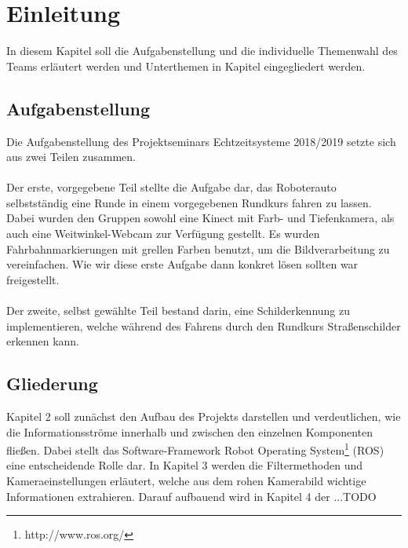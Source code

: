 \section{Einleitung}
In diesem Kapitel soll die Aufgabenstellung und die individuelle Themenwahl des Teams erl\"autert werden und Unterthemen in Kapitel eingegliedert werden.


\subsection{Aufgabenstellung}
Die Aufgabenstellung des Projektseminars Echtzeitsysteme 2018/2019 setzte sich aus zwei Teilen zusammen. \\\\
Der erste, vorgegebene Teil stellte die Aufgabe dar, das Roboterauto selbstst\"andig eine Runde in einem vorgegebenen Rundkurs fahren zu lassen. Dabei wurden den Gruppen sowohl eine Kinect mit Farb- und Tiefenkamera, als auch eine Weitwinkel-Webcam zur Verf\"ugung gestellt. Es wurden Fahrbahnmarkierungen mit grellen Farben benutzt, um die Bildverarbeitung zu vereinfachen. Wie wir diese erste Aufgabe dann konkret l\"osen sollten war freigestellt. \\\\
Der zweite, selbst gew\"ahlte Teil bestand darin, eine Schilderkennung zu implementieren, welche w\"ahrend des Fahrens durch den Rundkurs Stra\ss{}enschilder erkennen kann.

\subsection{Gliederung}
Kapitel 2 soll zun\"achst den Aufbau des Projekts darstellen und verdeutlichen, wie die Informationsstr\"ome innerhalb und zwischen den einzelnen Komponenten flie\ss{}en. Dabei stellt das Software-Framework Robot Operating System\footnote{http://www.ros.org/} (ROS) eine entscheidende Rolle dar. In Kapitel 3 werden die Filtermethoden und Kameraeinstellungen erl\"autert, welche aus dem rohen Kamerabild wichtige Informationen extrahieren. Darauf aufbauend wird in Kapitel 4 der ...TODO